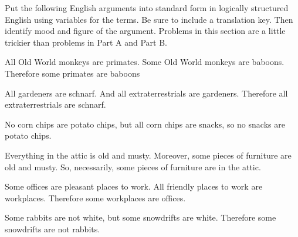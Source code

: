  \noindent\problempart Put the following English arguments into standard form in logically structured English using variables for the terms. Be sure to include a translation key. Then identify mood and figure of the argument. Problems in this section are a little trickier than problems in Part A and Part B. 


\begin{exercises}
\item All Old World monkeys are primates. Some Old World monkeys are baboons. Therefore some primates are baboons

 
\item All gardeners are schnarf. And all extraterrestrials are gardeners. Therefore all extraterrestrials are schnarf. 

 
\item No corn chips are potato chips, but all corn chips are snacks, so no snacks are potato chips. 

 
\item Everything in the attic is old and musty. Moreover, some pieces of furniture are old and musty. So, necessarily, some pieces of furniture are in the attic.


 
\item Some offices are pleasant places to work. All friendly places to work are workplaces. Therefore some workplaces are offices. 
 
 

\item Some rabbits are not white, but some snowdrifts are white. Therefore some snowdrifts are not rabbits.  

 

\end{exercises}
